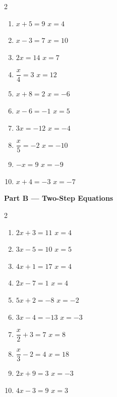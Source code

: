 \documentclass[12pt]{article}
\begin{document}
\vspace{6pt}
\begin{multicols}{2}
\begin{enumerate}[label=\textbf{\arabic*.}, itemsep=5pt]
  \item $x + 5 = 9$ \hfill $x = 4$
  \item $x - 3 = 7$ \hfill $x = 10$
  \item $2x = 14$ \hfill $x = 7$
  \item $\dfrac{x}{4} = 3$ \hfill $x = 12$
  \item $x + 8 = 2$ \hfill $x = -6$
  \item $x - 6 = -1$ \hfill $x = 5$
  \item $3x = -12$ \hfill $x = -4$
  \item $\dfrac{x}{5} = -2$ \hfill $x = -10$
  \item $-x = 9$ \hfill $x = -9$
  \item $x + 4 = -3$ \hfill $x = -7$
\end{enumerate}
\end{multicols}

\vspace{16pt}

\noindent\textbf{Part B --- Two-Step Equations}

\vspace{6pt}
\begin{multicols}{2}
\begin{enumerate}[label=\textbf{\arabic*.}, itemsep=5pt]
  \item $2x + 3 = 11$ \hfill $x = 4$
  \item $3x - 5 = 10$ \hfill $x = 5$
  \item $4x + 1 = 17$ \hfill $x = 4$
  \item $2x - 7 = 1$ \hfill $x = 4$
  \item $5x + 2 = -8$ \hfill $x = -2$
  \item $3x - 4 = -13$ \hfill $x = -3$
  \item $\dfrac{x}{2} + 3 = 7$ \hfill $x = 8$
  \item $\dfrac{x}{3} - 2 = 4$ \hfill $x = 18$
  \item $2x + 9 = 3$ \hfill $x = -3$
  \item $4x - 3 = 9$ \hfill $x = 3$
\end{enumerate}
\end{multicols}
\end{document}
